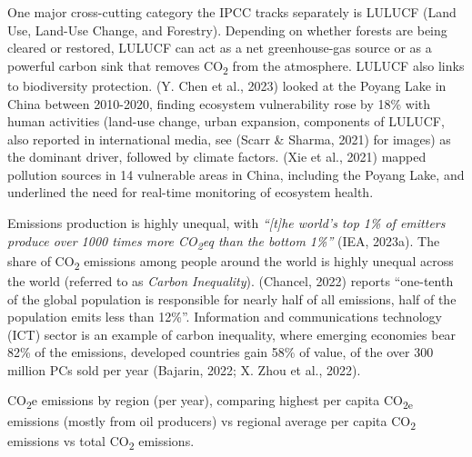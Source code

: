 \documentclass[
  12pt,
  letterpaper,
  DIV=11,
  numbers=noendperiod]{scrartcl}
\begin{document}
One major cross-cutting category the IPCC tracks separately is LULUCF
(Land Use, Land-Use Change, and Forestry). Depending on whether forests
are being cleared or restored, LULUCF can act as a net greenhouse-gas
source or as a powerful carbon sink that removes CO\textsubscript{2}
from the atmosphere. LULUCF also links to biodiversity protection. (Y.
Chen et al., 2023) looked at the Poyang Lake in China between 2010-2020,
finding ecosystem vulnerability rose by 18\% with human activities
(land-use change, urban expansion, components of LULUCF, also reported
in international media, see (Scarr \& Sharma, 2021) for images) as the
dominant driver, followed by climate factors. (Xie et al., 2021) mapped
pollution sources in 14 vulnerable areas in China, including the Poyang
Lake, and underlined the need for real-time monitoring of ecosystem
health.

Emissions production is highly unequal, with \emph{``{[}t{]}he world's
top 1\% of emitters produce over 1000 times more CO\textsubscript{2}eq
than the bottom 1\%''} (IEA, 2023a). The share of CO\textsubscript{2}
emissions among people around the world is highly unequal across the
world (referred to as \emph{Carbon Inequality}). (Chancel, 2022) reports
``one-tenth of the global population is responsible for nearly half of
all emissions, half of the population emits less than 12\%''.
Information and communications technology (ICT) sector is an example of
carbon inequality, where emerging economies bear 82\% of the emissions,
developed countries gain 58\% of value, of the over 300 million PCs sold
per year (Bajarin, 2022; X. Zhou et al., 2022).

CO\textsubscript{2}e emissions by region (per year), comparing highest
per capita CO\textsubscript{2e} emissions (mostly from oil producers) vs
regional average per capita CO\textsubscript{2} emissions vs total
CO\textsubscript{2} emissions.

\def\pandoctableshortcapt{Regional CO\textsubscript{2} Emissions
Comparison}
\end{document}
